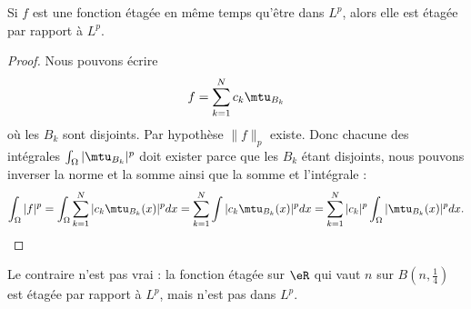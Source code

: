 \begin{lemma}   \label{LemWHIRdaX}
    Si \( f\) est une fonction étagée en même temps qu'être dans \( L^p\), alors elle est étagée par rapport à \( L^p\).
\end{lemma}

\begin{proof}
    Nous pouvons écrire
    \begin{equation}
        f=\sum_{k=1}^Nc_k\mtu_{B_k}
    \end{equation}
    où les \( B_k\) sont disjoints. Par hypothèse \( \| f \|_p\) existe. Donc chacune des intégrales \( \int_{\Omega}| \mtu_{B_k} |^p\) doit exister parce que les \( B_k\) étant disjoints, nous pouvons inverser la norme et la somme ainsi que la somme et l'intégrale :
    \begin{equation}
        \int_{\Omega}|f|^p=\int_{\Omega}\sum_{k=1}^N| c_k\mtu_{B_k}(x) |^pdx=\sum_{k=1}^N\int| c_k\mtu_{B_k}(x) |^pdx=\sum_{k=1}^N| c_k |^p\int_{\Omega}| \mtu_{B_k}(x) |^pdx.
    \end{equation}
\end{proof}
Le contraire n'est pas vrai : la fonction étagée sur \( \eR\) qui vaut \( n\) sur \( B(n,\frac{1}{ 4 })\) est étagée par rapport à \( L^p\), mais n'est pas dans \( L^p\).

